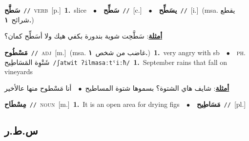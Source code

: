 \documentclass[10pt,a4paper,twoside]{article} %
\begin{document}
\begin{multicols}{2}
{\setlength\topsep{0pt}\textbf{\foreignlanguage{arabic}{سَطَّح}}\ {\color{gray}\texttt{//}\color{black}}\ \textsc{verb}\ [p.]\ \textbf{1.}~slice\ \ $\bullet$\ \ \setlength\topsep{0pt}\textbf{\foreignlanguage{arabic}{سَطِّح}}\ {\color{gray}\texttt{//}\color{black}}\ [c.]\ \ $\bullet$\ \ \setlength\topsep{0pt}\textbf{\foreignlanguage{arabic}{يسَطِّح}}\ {\color{gray}\texttt{//}\color{black}}\ [i.]\ \color{gray}(msa. \foreignlanguage{arabic}{يقطع شرائح}~\foreignlanguage{arabic}{\textbf{١.}})\color{black}\  \begin{flushright}\color{gray}\foreignlanguage{arabic}{\textbf{\underline{\foreignlanguage{arabic}{أمثلة}}}: سَطَّحِت شوية بندورة بكفي هيك ولا أسَطِّح كمان؟}\end{flushright}\color{black}} \vspace{2mm}

{\setlength\topsep{0pt}\textbf{\foreignlanguage{arabic}{مَسْطُوح}}\ {\color{gray}\texttt{//}\color{black}}\ \textsc{adj}\ [m.]\ \color{gray}(msa. \foreignlanguage{arabic}{غاضب من شخص}~\foreignlanguage{arabic}{\textbf{١.}})\color{black}\ \textbf{1.}~very angry with sb\ \ $\bullet$\ \ \textsc{ph.} \color{gray} \foreignlanguage{arabic}{شَتْوِة المَسَاطِيح}\color{black}\ {\color{gray}\texttt{/{\sffamily ʃatwit ʔilmasaːtˤiːħ}/}\color{black}}\ \textbf{1.}~September rains that fall on vineyards\  \begin{flushright}\color{gray}\foreignlanguage{arabic}{\textbf{\underline{\foreignlanguage{arabic}{أمثلة}}}: شايف هاي الشتوة؟ بسموها شتوة المساطيح\ $\bullet$\ \  أنا مَسْطوح منها عالأخير}\end{flushright}\color{black}} \vspace{2mm}

{\setlength\topsep{0pt}\textbf{\foreignlanguage{arabic}{مِسْطَاح}}\ {\color{gray}\texttt{//}\color{black}}\ \textsc{noun}\ [m.]\ \textbf{1.}~It is an open area for drying figs\ \ $\bullet$\ \ \setlength\topsep{0pt}\textbf{\foreignlanguage{arabic}{مَسَاطِيح}}\ {\color{gray}\texttt{//}\color{black}}\ [pl.]\ } \vspace{2mm}

\vspace{-3mm}
\subsection*{\color{blue}\foreignlanguage{arabic}{س.ط.ر}\color{blue}{}} 


\end{multicols}
\end{document}
